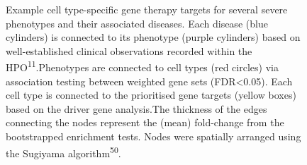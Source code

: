 \documentclass[
]{article}
\begin{document}
\newpage{}

\begin{figure}


\caption{\label{fig-therapy-examples-supp}Example cell type-specific
gene therapy targets for several severe phenotypes and their associated
diseases. Each disease (blue cylinders) is connected to its phenotype
(purple cylinders) based on well-established clinical observations
recorded within the HPO\textsuperscript{11}.Phenotypes are connected to
cell types (red circles) via association testing between weighted gene
sets (FDR\textless0.05). Each cell type is connected to the prioritised
gene targets (yellow boxes) based on the driver gene analysis.The
thickness of the edges connecting the nodes represent the (mean)
fold-change from the bootstrapped enrichment tests. Nodes were spatially
arranged using the Sugiyama algorithm\textsuperscript{50}.}

\end{figure}%

\newpage{}
\end{document}
